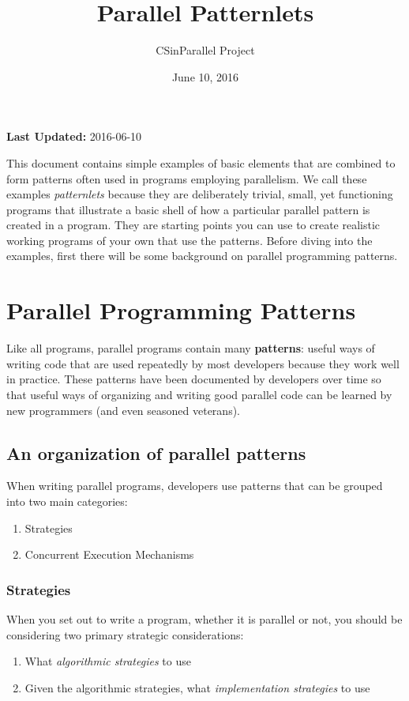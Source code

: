 \documentclass[letterpaper,10pt,openany,oneside]{sphinxmanual}
\title{Parallel Patternlets}
\date{June 10, 2016}
\author{CSinParallel Project}
\begin{document}
\maketitle
\tableofcontents
{}\label{index::doc}


\textbf{Last Updated:} 2016-06-10

This document contains simple examples of basic elements that are combined to form patterns often used in programs employing parallelism.  We call these examples \emph{patternlets} because they are deliberately trivial, small, yet functioning programs that illustrate a basic shell of how a particular parallel pattern is created in a program.  They are starting points you can use to create realistic working programs of your own that use the patterns.  Before diving into the examples, first there will be some background on parallel programming patterns.


\chapter{Parallel Programming Patterns}
\label{PatternsIntro:parallel-programming-patterns}\label{PatternsIntro::doc}\label{PatternsIntro:parallel-patternlets}
Like all programs, parallel programs contain many \textbf{patterns}: useful ways of writing code that are used repeatedly by most developers because they work well in practice.  These patterns have been documented by developers over time so that useful ways of organizing and writing good parallel code can be learned by new programmers (and even seasoned veterans).


\section{An organization of parallel patterns}
\label{PatternsIntro:an-organization-of-parallel-patterns}
When writing parallel programs, developers use patterns that can be grouped into two main categories:
\begin{enumerate}
\item {} 
Strategies

\item {} 
Concurrent Execution Mechanisms

\end{enumerate}


\subsection{Strategies}
\label{PatternsIntro:strategies}
When you set out to write a program, whether it is parallel or not, you should be considering two primary strategic considerations:
\begin{enumerate}
\item {} 
What \emph{algorithmic strategies} to use

\item {} 
Given the algorithmic strategies, what \emph{implementation strategies} to use

\end{enumerate}
\end{document}
